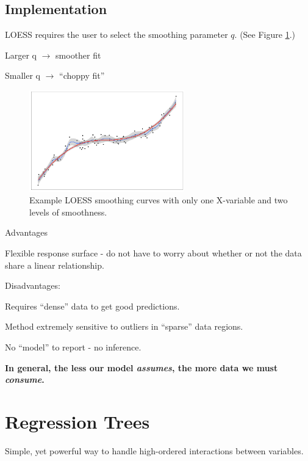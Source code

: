 \documentclass[12pt]{../notes}
\begin{document}
\subsection{Implementation}
LOESS requires the user to select the smoothing parameter $q$. (See Figure \ref{fig:loessCurve}.) 
\bi
\item Larger q $\rightarrow$ smoother fit
\item Smaller q $\rightarrow$ ``choppy fit''
\ei


\begin{figure}[H]
\centering
\includegraphics[width = 0.6\textwidth]{../figures/module4/loessCurve.png}
\caption{Example LOESS smoothing curves with only one X-variable and two levels of smoothness.}
\label{fig:loessCurve}
\end{figure}

\bi
\item Advantages
\bi
\item Flexible response surface - do not have to worry about whether or not the data share a linear relationship. 
\ei
\item Disadvantages:
\bi
\item Requires ``dense'' data to get good predictions. 
\bi
\item Method extremely sensitive to outliers in ``sparse'' data regions. 
\ei
\item No ``model'' to report - no inference. 
\ei
\ei

\textbf{In general, the less our model \textit{assumes}, the more data we must \textit{consume}.}

\newpage
\section{Regression Trees}
Simple, yet powerful way to handle high-ordered interactions between variables. 
\end{document}

